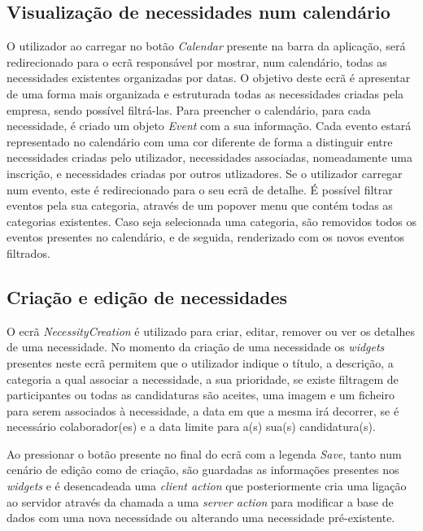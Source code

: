 \subsection{Visualização de necessidades num calendário}\label{subsec:implementacao:calendarNecessitiesView}
O utilizador ao carregar no botão \textit{Calendar} presente na barra da aplicação, será redirecionado para o ecrã responsável por mostrar, num calendário, todas as necessidades existentes organizadas por datas. 
O objetivo deste ecrã é apresentar de uma forma mais organizada e estruturada todas as necessidades criadas pela empresa, sendo possível filtrá-las. 
Para preencher o calendário, para cada necessidade, é criado um objeto \textit{Event} com a sua informação. 
Cada evento estará representado no calendário com uma cor diferente de forma a distinguir entre necessidades criadas pelo utilizador, necessidades associadas, nomeadamente uma inscrição, e necessidades criadas por outros utlizadores.
Se o utilizador carregar num evento, este é redirecionado para o seu ecrã de detalhe. 
É possível filtrar eventos pela sua categoria, através de um popover menu que contém todas as categorias existentes. 
Caso seja selecionada uma categoria, são removidos todos os eventos presentes no calendário, e de seguida, renderizado com os novos eventos filtrados.

\subsection{Criação e edição de necessidades}\label{subsec:implementacao:necessityCreation}

O ecrã \textit{NecessityCreation} é utilizado para criar, editar, remover ou ver os detalhes de uma necessidade.
No momento da criação de uma necessidade os \textit{widgets} presentes neste ecrã permitem que o utilizador indique o título, a descrição, a categoria a qual associar a necessidade, a sua prioridade, 
se existe filtragem de participantes ou todas as candidaturas são aceites, uma imagem e um ficheiro para serem associados à necessidade, a data em que a mesma irá decorrer, se é necessário colaborador(es) e a data limite para a(s) sua(s) candidatura(s).

Ao pressionar o botão presente no final do ecrã com a legenda \textit{Save}, tanto num cenário de edição como de criação, 
são guardadas as informações presentes nos \textit{widgets} e é desencadeada uma \textit{client action} que posteriormente cria uma ligação ao servidor através da chamada a uma \textit{server action} para modificar a base de dados com uma nova necessidade ou alterando uma necessidade pré-existente.

